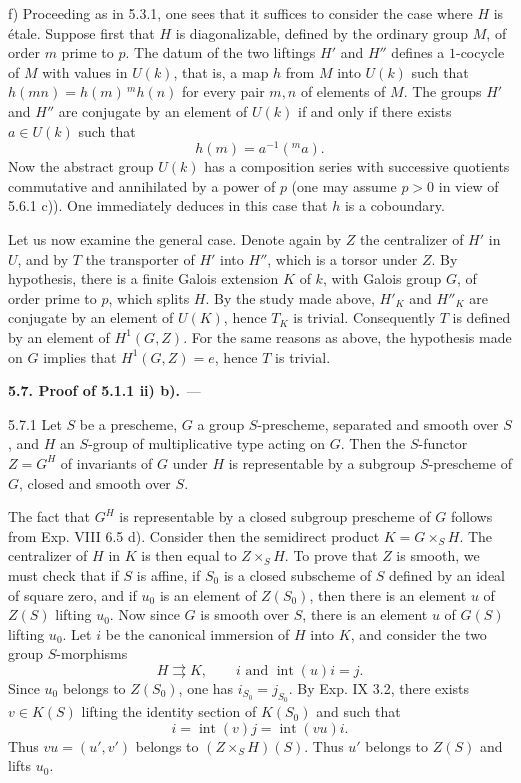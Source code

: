 f) Proceeding as in 5.3.1, one sees that it suffices to consider the case where $H$ is étale. Suppose first that $H$ is diagonalizable, defined by the ordinary group $M$, of order $m$ prime to $p$. The datum of the two liftings $H'$ and $H''$ defines a $1$-cocycle of $M$ with values in $U(k)$, that is, a map $h$ from $M$ into $U(k)$ such that $h(mn)=h(m)\,{}^mh(n)$ for every pair $m,n$ of elements of $M$. The groups $H'$ and $H''$ are conjugate by an element of $U(k)$ if and only if there exists $a\in U(k)$ such that
\[
 h(m)=a^{-1}({}^ma).
\]
Now the abstract group $U(k)$ has a composition series with successive quotients commutative and annihilated by a power of $p$ (one may assume $p>0$ in view of 5.6.1 c)). One immediately deduces in this case that $h$ is a coboundary.

Let us now examine the general case. Denote again by $Z$ the centralizer of $H'$ in $U$, and by $T$ the transporter of $H'$ into $H''$, which is a torsor under $Z$. By hypothesis, there is a finite Galois extension $K$ of $k$, with Galois group $G$, of order prime to $p$, which splits $H$. By the study made above, $H'_K$ and $H''_K$ are conjugate by an element of $U(K)$, hence $T_K$ is trivial. Consequently $T$ is defined by an element of $H^1(G,Z)$. For the same reasons as above, the hypothesis made on $G$ implies that $H^1(G,Z)=e$, hence $T$ is trivial.

\par\medskip\noindent\textbf{5.7. Proof of 5.1.1 ii) b).}\ ---\par\label{XVII.5.7}
\begin{lemma}{5.7.1}\label{XVII.5.7.1}
Let $S$ be a prescheme, $G$ a group $S$-prescheme, separated and smooth over $S$, and $H$ an $S$-group of multiplicative type acting on $G$. Then the $S$-functor $Z=G^H$ of invariants of $G$ under $H$ is representable by a subgroup $S$-prescheme of $G$, closed and smooth over $S$.
\end{lemma}
The fact that $G^H$ is representable by a closed subgroup prescheme of $G$ follows from Exp. VIII 6.5 d). Consider then the semidirect product $K=G\times_S H$. The centralizer of $H$ in $K$ is then equal to $Z\times_S H$. To prove that $Z$ is smooth, we must check that if $S$ is affine, if $S_0$ is a closed subscheme of $S$ defined by an ideal of square zero, and if $u_0$ is an element of $Z(S_0)$, then there is an element $u$ of $Z(S)$ lifting $u_0$. Now since $G$ is smooth over $S$, there is an element $u$ of $G(S)$ lifting $u_0$. Let $i$ be the canonical immersion of $H$ into $K$, and consider the two group $S$-morphisms
\[
 H\rightrightarrows K,\qquad i\text{ and }\operatorname{int}(u)i=j.
\]
Since $u_0$ belongs to $Z(S_0)$, one has $i_{S_0}=j_{S_0}$. By Exp. IX 3.2, there exists $v\in K(S)$ lifting the identity section of $K(S_0)$ and such that
\[
 i=\operatorname{int}(v)j=\operatorname{int}(vu)i.
\]
Thus $vu=(u',v')$ belongs to $(Z\times_S H)(S)$. Thus $u'$ belongs to $Z(S)$ and lifts $u_0$.

